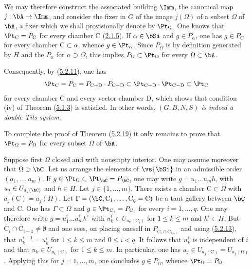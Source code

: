 \documentclass[12pt,a4paper,oneside,english]{smfart}
\makeatletter
\newcommand{\btanchor}[1]{\leavevmode\Hy@raisedlink{\hypertarget{bt:#1}{}}}
\newcommand{\btpageanchor}[1]{\Hy@raisedlink{\hypertarget{p:#1}{}}}
\newcommand{\btref}[1]{\hyperlink{bt:#1}{#1}}
\newcommand{\btpage}[1]{\marginnote{p.~#1}\btpageanchor{#1}}
\newcommand{\pg}[1]{\btpage{#1}}
\theoremstyle{definition}
\theoremstyle{bt}
\makeatother
\begin{document}
\pg{103}
We may therefore construct the associated building $\Imm$, the canonical map
$j:\bA\to\Imm$, and consider the fixer in $G$ of the image $j(\Omega)$ of a
subset $\Omega$ of $\bA$, a fixer which we shall provisionally denote by
$\Pt_{\Omega}$. One knows that $\Pt_{\mathrm{C}}=P_{\mathrm{C}}$ for every
chamber $\mathrm{C}$ (\btref{2.1.5}). If $\alpha\in\bSi$ and $g\in P_{\alpha}$, one has
$g\in P_{\mathrm{C}}$ for every chamber $\mathrm{C}\subset\alpha$, whence
$g\in\Pt_{\alpha}$. Since $P_{\Omega}$ is by definition generated by $H$ and the
$P_{\alpha}$ for $\alpha\supset\Omega$, this implies
$P_{\Omega}\subset\Pt_{\Omega}$ for every $\Omega\subset\bA$.

\btanchor{5.2.24}
Consequently, by (\btref{5.2.11}), one has
\[
\Pt_{\mathrm{C}}=P_{\mathrm{C}}=P_{\mathrm{C}+\mathrm{D}}\cdot P_{\mathrm{C}-\mathrm{D}}
\subset\Pt_{\mathrm{C}+\mathrm{D}}\cdot\Pt_{\mathrm{C}-\mathrm{D}}
\subset\Pt_{\mathrm{C}}
\]
for every chamber $\mathrm{C}$ and every vector chamber $\mathrm{D}$, which
shows that condition (iv) of Theorem (\btref{5.1.3}) is satisfied. In other words,
\emph{$(G,B,N,S)$ is indeed a double Tits system}.

\btanchor{5.2.25}
To complete the proof of Theorem (\btref{5.2.19}) it only remains to prove that
$\Pt_{\Omega}=P_{\Omega}$ for every subset $\Omega$ of $\bA$.

Suppose first $\Omega$ closed and with nonempty interior. One may assume
moreover that $\Omega\supset\bC$. Let us arrange the elements of $\vs{\bSi}$ in
an admissible order $(a_{1},\dots,a_{m})$. If
$g\in\Pt_{\Omega}\subset\Pt_{\bC}=P_{\bC}$, one may write
$g=u_{1}\dots u_{m}h$, with $u_{j}\in U_{a_{j}(\bC)}$ and $h\in H$. Let
$j\in\{1,\dots,m\}$. There exists a chamber $\mathrm{C}\subset\Omega$ with
$a_{j}(\mathrm{C})=a_{j}(\Omega)$. Let
$\Gamma=(\bC,\mathrm{C}_{1},\dots,\mathrm{C}_{q}=\mathrm{C})$ be a taut gallery
between $\bC$ and $\mathrm{C}$. One has $\Gamma\subset\Omega$ and
$g\in\Pt_{\mathrm{C}_{i}}=P_{\mathrm{C}_{i}}$ for every $i=1,\dots,q$. One may
therefore write $g=u^{i}_{1}\dots u^{i}_{m}h^{i}$ with
$u^{i}_{k}\in U_{a_{k}(\mathrm{C}_{i})}$ for $1\leqslant k\leqslant m$ and
$h^{i}\in H$. But
$\overline{\mathrm{C}}_{i}\cap\overline{\mathrm{C}}_{i+1}\neq\emptyset$ and one
sees, on placing oneself in
$P_{\overline{\mathrm{C}}_{i}\cap\overline{\mathrm{C}}_{i+1}}$ and using
(\btref{5.2.13}), that $u^{i+1}_{k}=u^{i}_{k}$ for $1\leqslant k\leqslant m$ and
$0\leqslant i<q$. It follows that $u^{i}_{k}$ is independent of $i$ and that
$u_{k}\in U_{a_{k}(\mathrm{C})}$ for $1\leqslant k\leqslant m$. In particular,
one has $u_{j}\in U_{a_{j}(\mathrm{C})}=U_{a_{j}(\Omega)}$. Applying this for
$j=1,\dots,m$, one concludes $g\in P_{\Omega}$, whence
$\Pt_{\Omega}=P_{\Omega}$.
\end{document}
